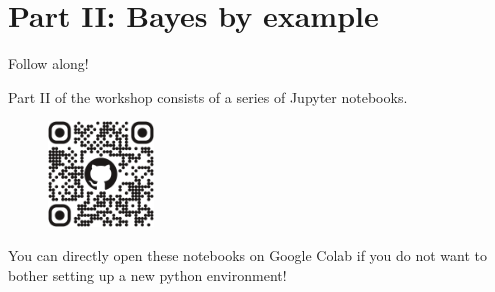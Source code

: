 \documentclass[12pt,aspectratio=169]{beamer}
\begin{document}
\section{Part II: Bayes by example}

\begin{frame}{Follow along!}

Part II of the workshop consists of a series of Jupyter notebooks.
\newline

\begin{figure}
\centering
\includegraphics[width=0.25\textwidth]{figs/bayes_workshop_qr.png}
\end{figure}

You can directly open these notebooks on Google Colab if you do not want to bother setting up a new python environment!

\end{frame}









\end{document}
